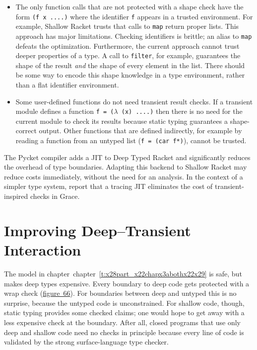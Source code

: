 \documentclass[ twoside,open=right,titlepage,numbers=noenddot,headinclude,%
                footinclude=true,cleardoublepage=empty,abstract=off,
                BCOR=5mm,paper=a4,fontsize=11pt,%
                ngerman,american,%
                parts,pdfspacing]{scrreprt}
\newcommand{\ChapRef}[2]{\SecRef{#1}{#2}}
\newcommand{\SecRef}[2]{section~#1}
\newcommand{\ChapRefLocal}[3]{\hyperref[#1]{\ChapRef{#2}{#3}}}
\newcommand{\Scribtexttt}[1]{{\texttt{#1}}}
\newlength{\stabLeft}
\newcommand{\atItemizeStart}[0]{\addtolength{\stabLeft}{\labelsep}
                                \addtolength{\stabLeft}{\labelwidth}}
\let\SOriginalthesubsubsection\thesubsubsection
\newcommand{\Ssubsection}[2]{\subsection[#1]{#2}\let\thesubsubsection\SOriginalthesubsubsection}
\newcommand{\FigureRef}[2]{#1}
\renewcommand{\Ssubsection}[2]{\section[#1]{#2}}
\renewcommand{\ChapRefLocal}[3]{chapter~\ref{#1}}
\begin{document}
\noindent \begin{itemize}\atItemizeStart

\item The only function calls that are not protected with a shape check have
 the form \Scribtexttt{(f x {\hbox{\texttt{.}}}{\hbox{\texttt{.}}}{\hbox{\texttt{.}}}{\hbox{\texttt{.}}})} where the identifier \Scribtexttt{f} appears
 in a trusted environment.
For example, Shallow Racket trusts that calls to \Scribtexttt{map} return
 proper lists.
This approach has major limitations.
Checking identifiers is brittle; an alias to \Scribtexttt{map} defeats the optimization.
Furthermore, the current approach cannot trust deeper properties of a type.
A call to \Scribtexttt{filter}, for example, guarantees the shape of the result
 \emph{and} the shape of every element in the list.
There should be some way to encode this shape knowledge in a type environment,
 rather than a flat identifier environment.

\item Some user{-}defined functions do not need transient result checks.
If a transient module defines a function \Scribtexttt{f = ($\lambda$ (x) {\hbox{\texttt{.}}}{\hbox{\texttt{.}}}{\hbox{\texttt{.}}}{\hbox{\texttt{.}}})}
 then there is no need for the current module to check its results
 because static typing guarantees a shape{-}correct output.
Other functions that are defined indirectly, for example by reading
 a function from an untyped list (\Scribtexttt{f = (car f*)}),
 cannot be trusted.\end{itemize}

The Pycket compiler adds a JIT to Deep Typed Racket and significantly
 reduces the overhead of type boundaries.
Adapting this backend to Shallow Racket may reduce costs immediately,
 without the need for an analysis.
In the context of a simpler type system,
 report that a tracing JIT eliminates the cost
 of transient{-}inspired checks in Grace.

\Ssubsection{Improving Deep{--}Transient Interaction}{Improving Deep{--}Transient Interaction}\label{t:x28part_x22secx3afuturex3anonoptx22x29}

The model in chapter~\ChapRefLocal{t:x28part_x22chapx3abothx22x29}{6}{Deep and Shallow, Combined} is safe, but makes deep types expensive.
Every boundary to deep code gets protected with a wrap check (\hyperref[t:x28counter_x28x22figurex22_x22figx3abothx3abasex2dinteractionx22x29x29]{figure~\FigureRef{66}{t:x28counter_x28x22figurex22_x22figx3abothx3abasex2dinteractionx22x29x29}}).
For boundaries between deep and untyped this is no surprise, because
 the untyped code is unconstrained.
For shallow code, though, static typing provides some checked claims;
 one would hope to get away with a less expensive check at the boundary.
After all, closed programs that use only deep and shallow code
 need no checks in principle because every line of code is validated by the
 strong surface{-}language type checker.
\end{document}
